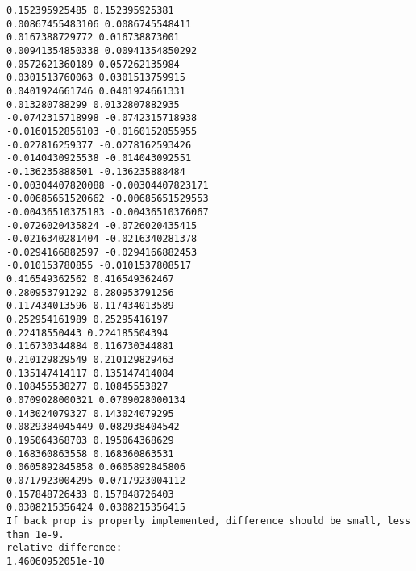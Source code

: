 \documentclass[11pt]{article}
\begin{document}
    \begin{Verbatim}[commandchars=\\\{\}]
0.152395925485 0.152395925381
0.00867455483106 0.0086745548411
0.0167388729772 0.016738873001
0.00941354850338 0.00941354850292
0.0572621360189 0.057262135984
0.0301513760063 0.0301513759915
0.0401924661746 0.0401924661331
0.013280788299 0.0132807882935
-0.0742315718998 -0.0742315718938
-0.0160152856103 -0.0160152855955
-0.027816259377 -0.0278162593426
-0.0140430925538 -0.014043092551
-0.136235888501 -0.136235888484
-0.00304407820088 -0.00304407823171
-0.00685651520662 -0.00685651529553
-0.00436510375183 -0.00436510376067
-0.0726020435824 -0.0726020435415
-0.0216340281404 -0.0216340281378
-0.0294166882597 -0.0294166882453
-0.010153780855 -0.0101537808517
0.416549362562 0.416549362467
0.280953791292 0.280953791256
0.117434013596 0.117434013589
0.252954161989 0.25295416197
0.22418550443 0.224185504394
0.116730344884 0.116730344881
0.210129829549 0.210129829463
0.135147414117 0.135147414084
0.108455538277 0.10845553827
0.0709028000321 0.0709028000134
0.143024079327 0.143024079295
0.0829384045449 0.082938404542
0.195064368703 0.195064368629
0.168360863558 0.168360863531
0.0605892845858 0.0605892845806
0.0717923004295 0.0717923004112
0.157848726433 0.157848726403
0.0308215356424 0.0308215356415
If back prop is properly implemented, difference should be small, less than 1e-9.
relative difference: 
1.46060952051e-10

    \end{Verbatim}


    
    
    
    
\end{document}
